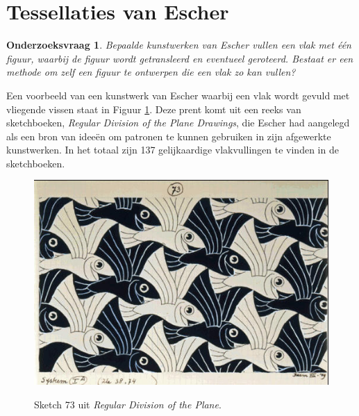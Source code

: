 \documentclass[11pt]{article}
\newtheorem{onderzoeksvraag}{Onderzoeksvraag}
\begin{document}
\section{Tessellaties van Escher}

\begin{onderzoeksvraag}
Bepaalde kunstwerken van {\it Escher} vullen een vlak met één figuur, waarbij de figuur wordt getransleerd en eventueel geroteerd. Bestaat er een methode om zelf een figuur te ontwerpen die een vlak zo kan vullen?
\end{onderzoeksvraag}

Een voorbeeld van een kunstwerk van Escher waarbij een vlak wordt gevuld met vliegende vissen staat in Figuur \ref{fig:E73}. Deze prent komt uit een reeks van sketchboeken, {\it Regular Division of the Plane Drawings}, die Escher had aangelegd als een bron van ideeën om patronen te kunnen gebruiken in zijn afgewerkte kunstwerken. In het totaal zijn 137 gelijkaardige vlakvullingen te vinden in de sketchboeken.

\begin{figure}[ht]
  \centering
  \includegraphics{E73}
  \label{fig:E73}
  \caption{Sketch 73 uit {\it Regular Division of the Plane}.}
\end{figure}
\end{document}
